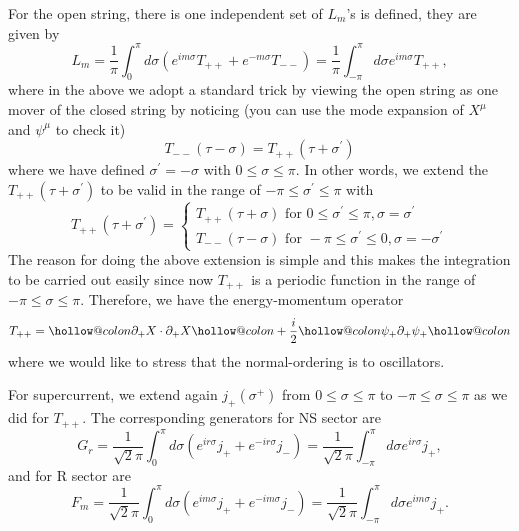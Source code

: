 \documentclass[graybox,envcountchap,sectrefs]{svmono}
\makeatletter
\newcommand{\hollowcolon}{\mathpalette\hollow@colon\relax}
\newcommand{\hollow@colon}[2]{%
  \mspace{1mu}%
  \vbox{%
    \hbox{$\m@th#1\smallcirc$}
    \nointerlineskip
    \kern.45ex
    \hbox{$\m@th#1\smallcirc$}
    \kern-.06ex
  }%
  \mspace{1mu}%
}
\newcommand{\hcolondel}[1]{%
  \mathopen{\hollowcolon}#1\mathclose{\hollowcolon}%
}
\makeatother
\begin{document}
For the open string, there is one independent set of $L_m$'s is defined, they are given by
\begin{equation}
L_{m}=\frac{1}{\pi}\int_{0}^{\pi}d\sigma \left( e^{im\sigma}T_{++}+e^{-m\sigma}T_{--}\right)=\frac{1}{\pi} \int_{-\pi}^{\pi} d \sigma e^{i m \sigma} T_{++},
\end{equation}
where in the above we adopt a standard trick by viewing the open string as one mover of the closed string by noticing (you can use the mode expansion of $X^{\mu}$ and $\psi^{\mu}$ to check it)
\begin{equation}
T_{--}(\tau-\sigma)=T_{++}\left(\tau+\sigma^{\prime}\right)
\end{equation}
where we have defined $\sigma^{\prime}=-\sigma$ with $0 \leq \sigma \leq \pi$.
In other words, we extend the $T_{++}\left(\tau+\sigma^{\prime}\right)$ to be valid in the range of $-\pi \leq \sigma^{\prime} \leq \pi$ with
\begin{equation}
T_{++}\left(\tau+\sigma^{\prime}\right)=\left\{\begin{array}{l}
T_{++}(\tau+\sigma) \text { for } 0 \leq \sigma^{\prime} \leq \pi, \sigma=\sigma^{\prime} \\
T_{--}(\tau-\sigma) \text { for }-\pi \leq \sigma^{\prime} \leq 0, \sigma=-\sigma^{\prime}
\end{array}\right.
\end{equation}
The reason for doing the above extension is simple and this makes the integration to be carried out easily since now $T_{++}$ is a periodic function in the range of $-\pi \leq \sigma \leq \pi$.
Therefore, we have the energy-momentum operator
\begin{equation}
T_{++}=  \hcolondel{ \partial_{+} X \cdot \partial_{+} X}+\frac{i}{2} \hcolondel{\psi_{+} \partial_{+} \psi_{+} }
\end{equation}
where we would like to stress that the normal-ordering is to oscillators.

For supercurrent, we extend again $j_{+}\left(\sigma^{+}\right)$ from $0 \leq \sigma \leq \pi$ to $-\pi \leq \sigma \leq \pi$ as we did for $T_{++}$. The corresponding generators for NS sector are
\begin{equation}
G_r=\frac{1}{\sqrt{2}\pi}\int_{0}^{\pi}d\sigma \left( e^{ir\sigma}j_{+}+e^{-ir\sigma}j_{-}\right)=\frac{1}{\sqrt{2}\pi}\int_{-\pi}^{\pi}d\sigma e^{ir\sigma}j_{+},
\end{equation}
and for R sector are
\begin{equation}
F_m=\frac{1}{\sqrt{2}\pi}\int_{0}^{\pi}d\sigma \left( e^{im\sigma}j_{+}+e^{-im\sigma}j_{-}\right)=\frac{1}{\sqrt{2}\pi}\int_{-\pi}^{\pi}d\sigma e^{im\sigma}j_{+}.
\end{equation}
\end{document}

